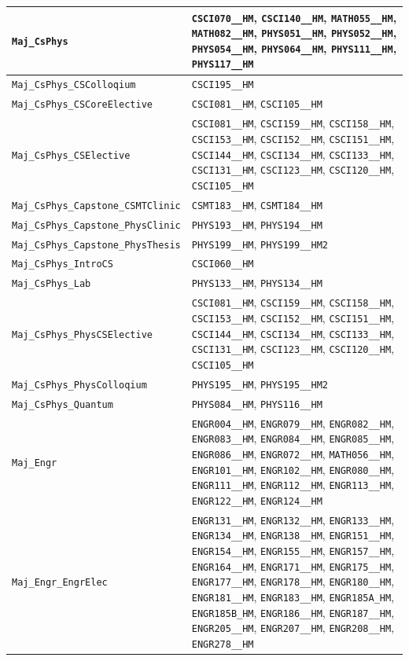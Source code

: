 \begin{longtable}{|p{4.4in}|p{4.4in}|}
    \verb|Maj_CsPhys| & \verb|CSCI070__HM|, \verb|CSCI140__HM|, \verb|MATH055__HM|, \verb|MATH082__HM|, \verb|PHYS051__HM|, \verb|PHYS052__HM|, \verb|PHYS054__HM|, \verb|PHYS064__HM|, \verb|PHYS111__HM|, \verb|PHYS117__HM|\\\hline
    \verb|Maj_CsPhys_CSColloqium| & \verb|CSCI195__HM|\\\hline
    \verb|Maj_CsPhys_CSCoreElective| & \verb|CSCI081__HM|, \verb|CSCI105__HM|\\\hline
    \verb|Maj_CsPhys_CSElective| & \verb|CSCI081__HM|, \verb|CSCI159__HM|, \verb|CSCI158__HM|, \verb|CSCI153__HM|, \verb|CSCI152__HM|, \verb|CSCI151__HM|, \verb|CSCI144__HM|, \verb|CSCI134__HM|, \verb|CSCI133__HM|, \verb|CSCI131__HM|, \verb|CSCI123__HM|, \verb|CSCI120__HM|, \verb|CSCI105__HM|\\\hline
    \verb|Maj_CsPhys_Capstone_CSMTClinic| & \verb|CSMT183__HM|, \verb|CSMT184__HM|\\\hline
    \verb|Maj_CsPhys_Capstone_PhysClinic| & \verb|PHYS193__HM|, \verb|PHYS194__HM|\\\hline
    \verb|Maj_CsPhys_Capstone_PhysThesis| & \verb|PHYS199__HM|, \verb|PHYS199__HM2|\\\hline
    \verb|Maj_CsPhys_IntroCS| & \verb|CSCI060__HM|\\\hline
    \verb|Maj_CsPhys_Lab| & \verb|PHYS133__HM|, \verb|PHYS134__HM|\\\hline
    \verb|Maj_CsPhys_PhysCSElective| & \verb|CSCI081__HM|, \verb|CSCI159__HM|, \verb|CSCI158__HM|, \verb|CSCI153__HM|, \verb|CSCI152__HM|, \verb|CSCI151__HM|, \verb|CSCI144__HM|, \verb|CSCI134__HM|, \verb|CSCI133__HM|, \verb|CSCI131__HM|, \verb|CSCI123__HM|, \verb|CSCI120__HM|, \verb|CSCI105__HM|\\\hline
    \verb|Maj_CsPhys_PhysColloqium| & \verb|PHYS195__HM|, \verb|PHYS195__HM2|\\\hline
    \verb|Maj_CsPhys_Quantum| & \verb|PHYS084__HM|, \verb|PHYS116__HM|\\\hline
    \verb|Maj_Engr| & \verb|ENGR004__HM|, \verb|ENGR079__HM|, \verb|ENGR082__HM|, \verb|ENGR083__HM|, \verb|ENGR084__HM|, \verb|ENGR085__HM|, \verb|ENGR086__HM|, \verb|ENGR072__HM|, \verb|MATH056__HM|, \verb|ENGR101__HM|, \verb|ENGR102__HM|, \verb|ENGR080__HM|, \verb|ENGR111__HM|, \verb|ENGR112__HM|, \verb|ENGR113__HM|, \verb|ENGR122__HM|, \verb|ENGR124__HM|\\\hline
    \verb|Maj_Engr_EngrElec| & \verb|ENGR131__HM|, \verb|ENGR132__HM|, \verb|ENGR133__HM|, \verb|ENGR134__HM|, \verb|ENGR138__HM|, \verb|ENGR151__HM|, \verb|ENGR154__HM|, \verb|ENGR155__HM|, \verb|ENGR157__HM|, \verb|ENGR164__HM|, \verb|ENGR171__HM|, \verb|ENGR175__HM|, \verb|ENGR177__HM|, \verb|ENGR178__HM|, \verb|ENGR180__HM|, \verb|ENGR181__HM|, \verb|ENGR183__HM|, \verb|ENGR185A_HM|, \verb|ENGR185B_HM|, \verb|ENGR186__HM|, \verb|ENGR187__HM|, \verb|ENGR205__HM|, \verb|ENGR207__HM|, \verb|ENGR208__HM|, \verb|ENGR278__HM|\\\hline

\end{longtable}
